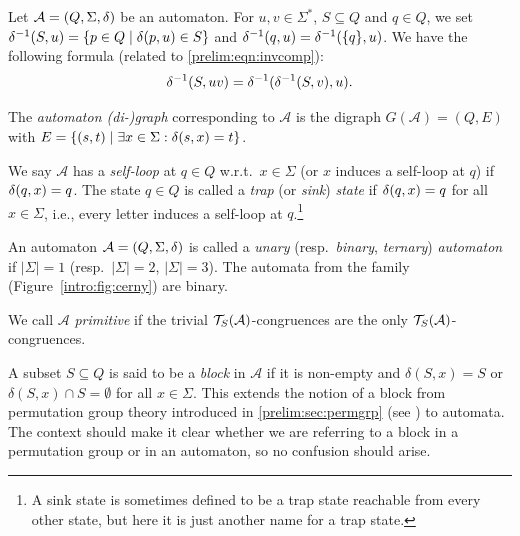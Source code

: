 
\label{def:inverse_transition}
Let $\mathcal A = (Q, \Sigma, \delta)$ be an automaton. For $u,v \in \Sigma^*$, $S \subseteq Q$ and $q \in Q$, we set 
$\applytrans{\delta^{-1}}{S}{u} %
= \{ p \in Q \mid \applytrans{\delta}{p}{u} \in S \}$
and $\delta^{-1}(q,u) = \delta^{-1}(\{q\},u)$. 
We have the following formula (related to \cref{prelim:eqn:invcomp}):
\begin{equation}\label{prelim:eqn:delta_inverse}
	\delta^{-1}(S,uv)
	= \delta^{-1}(\delta^{-1}(S,v),u).
\end{equation}

The \emph{automaton (di-)graph} corresponding to $\mathcal A$ 
is the digraph $G(\mathcal A) = (Q, E)$ with $E = \{ (s,t) \mid \exists x \in \Sigma : \delta(s,x) = t \}$. \label{def:aut_graph}

We say $\mathcal A$ has a \emph{self-loop} at $q \in Q$ w.r.t.~$x \in \Sigma$ (or $x$ induces a self-loop at $q$)
if $\delta(q,x) = q$.
The state $q \in Q$ is called a \emph{trap} (or \emph{sink}) \emph{state} if
$\delta(q,x) = q$ for all $x \in \Sigma$, i.e., every letter induces a self-loop at $q$.\footnote{A sink state is sometimes defined to be a trap state reachable from every other state, but here it is just another name for a trap state.}

An automaton $\mathcal A = (Q, \Sigma, \delta)$ 
is called a \emph{unary} (resp.~\emph{binary}, \emph{ternary}) \emph{automaton} if $|\Sigma| = 1$ (resp.~$|\Sigma| = 2$, $|\Sigma| = 3$).
The automata from the \Cerny
family (Figure~\ref{intro:fig:cerny}) are binary.

We call $\mathcal A$ \emph{primitive} if the trivial $\mathcal T_S(\mathcal A)$-congruences
are the only $\mathcal T_S(\mathcal A)$-congruences.

A subset $S \subseteq Q$ is said to be a \emph{block} in $\mathcal A$
if it is non-empty and $\delta(S, x) = S$
or $\delta(S, x) \cap S = \emptyset$
for all $x \in \Sigma$. This extends the notion of a block from permutation group theory
introduced in \cref{prelim:sec:permgrp} (see \pageref{def:block-perm-grp})
to automata. 
The context should make it clear whether we are referring to a block in a permutation group 
or in an automaton, so no confusion should arise.